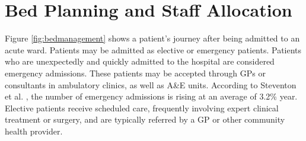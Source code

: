 \documentclass[../thesis.tex]{subfiles}
\begin{document}


\section{Bed Planning and Staff Allocation}
Figure \ref{fig:bedmanagement} shows a patient's journey after being admitted to an acute ward. Patients may be admitted as elective or emergency patients. Patients who are unexpectedly and quickly admitted to the hospital are considered emergency admissions. These patients may be accepted through GPs or consultants in ambulatory clinics, as well as A\&E units. According to Steventon et al. \cite{Steventon2018}, the number of emergency admissions is rising at an average of 3.2\% year. Elective patients receive scheduled care, frequently involving expert clinical treatment or surgery, and are typically referred by a GP or other community health provider.
\end{document}
